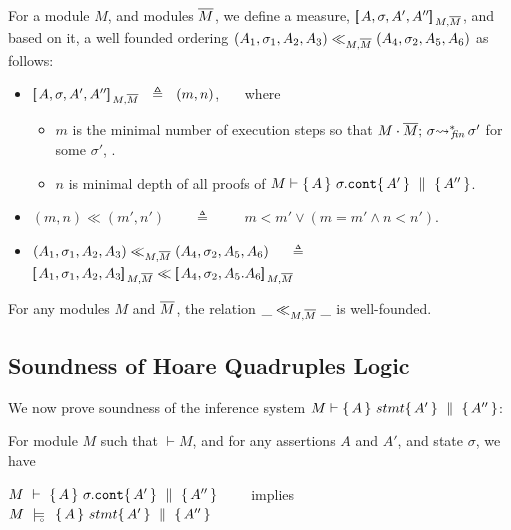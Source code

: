{
\begin{definition}
For a module $M$, and modules $\overline{M}$,   we define a measure, $[\!\![\, A, \sigma,A',A'' ]\!\!]\,_{M,\overline{M}} $, and based on it, a well founded ordering $(A_1,\sigma_1,A_2, A_3) \ll_{M,\overline{M}}  (A_4,\sigma_2,A_5,A_6)$
as follows:
\begin{itemize}
\item
 $[\!\![\, A, \sigma,A',A'' ]\!\!]\,_{M,\overline{M}} \  \ \triangleq \ \  (m, n)$,  \ \ \  where
\begin{itemize}
\item
$m$ is the minimal number of execution steps so that $ M\cdot \overline{M};\, {\sigma} {\rightsquigarrow^*}\!\!_{\mathit{fin}}\, \sigma'$  for some $\sigma'$, .
 \item
  $n$ is minimal depth of all proofs of $M \vdash  \{\, A \, \}\ \sigma.\mbox{\normalfont{\texttt{cont}}} \{\, A' \, \} \, \,\parallel\,\, \{\, A'' \, \}  $.
\end{itemize}
 \item
 $(m,n) \ll (m',n')$\ \  \ \ $\triangleq$ \ \  \ \ $ m<m'\vee  (m=m'  \wedge n < n')   $.
\item
$(A_1,\sigma_1,A_2, A_3) \ll_{M,\overline{M}}  (A_4,\sigma_2,A_5, A_6)$  \  \  $\triangleq$ \ \ 
$\measure {A_1, \sigma_1,A_2, A_3} {M,\Mtwo}  \ll \measure {A_4, \sigma_2,A_5. A_6} {M,\Mtwo} $
\end{itemize}
\end{definition}
}


\begin{auxLemma}
\label{lemma:normal:two}
For any modules $M$ and $\overline{M}$,  the relation $\_ \ll_{M,\overline{M}}  \_$ is well-founded.
\end{auxLemma}

  

\subsection{ Soundness of  Hoare Quadruples Logic}
\label{sect:prove:sound:quadruples}
We now prove soundness of the inference system $M \vdash   \{\, A \, \}\ stmt \{\, A' \, \} \, \,\parallel\,\, \{\, A'' \, \} $:


\begin{theorem}
\label{t:quadruple:sound}
For module  $M$ %
such that  $\vdash M$, and for any assertions $A$ and $A'$, and state  $\sigma$, we have

\begin{center}
$M\ \vdash\   \{\, A \, \}\ \sigma.\mbox{\normalfont{\texttt{cont}}} \{\, A' \, \} \, \,\parallel\,\, \{\, A'' \, \} $ \ \ \ \ implies \ \ \ \ $M\ \models\!\!\!\!_{_{\circ}}\ \   \{\, A \, \}\ stmt \{\, A' \, \} \, \,\parallel\,\, \{\, A'' \, \} $
\end{center}

\end{theorem}


